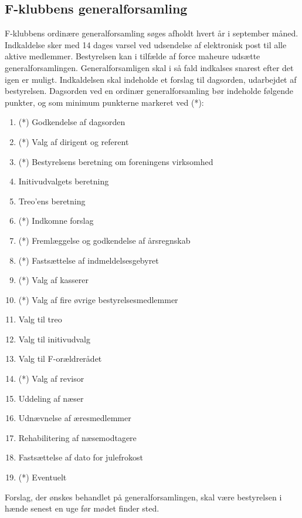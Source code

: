 \documentclass[a4paper,12pt,danish]{article}
\begin{document}
\begin{list}
\section{F-klubbens generalforsamling}

\item \label{par-gen} F-klubbens ordinære generalforsamling
  søges afholdt hvert år i september måned. Indkaldelse sker med 14
  dages varsel ved udsendelse af elektronisk post til alle aktive
  medlemmer. Bestyrelsen kan i tilfælde af force maheure udsætte 
  generalforsamlingen. Generalforsamligen skal i så fald indkalses 
  snarest efter det igen er muligt. Indkaldelsen skal indeholde et forslag til
  dagsorden, udarbejdet af bestyrelsen. Dagsorden ved en ordinær
  generalforsamling bør indeholde følgende punkter, og som minimum
punkterne markeret ved (*):

\begin{enumerate}
\item (*) Godkendelse af dagsorden
\item (*) Valg af dirigent og referent
\item (*) Bestyrelsens beretning om foreningens virksomhed
\item Initivudvalgets beretning
\item Treo'ens beretning
\item (*) Indkomne forslag
\item (*) Fremlæggelse og godkendelse af årsregnskab
\item (*) Fastsættelse af indmeldelsesgebyret
\item (*) Valg af kasserer
\item (*) Valg af fire øvrige bestyrelsesmedlemmer
\item Valg til treo
\item Valg til initivudvalg
\item Valg til F-orældrerådet
\item (*) Valg af revisor
\item Uddeling af næser
\item Udnævnelse af æresmedlemmer
\item Rehabilitering af næsemodtagere
\item Fastsættelse af dato for julefrokost
\item (*) Eventuelt
\end{enumerate}

Forslag, der ønskes behandlet på generalforsamlingen, skal
være bestyrelsen i hænde senest en uge før mødet finder
  sted.
  

\end{list}
\end{document}
